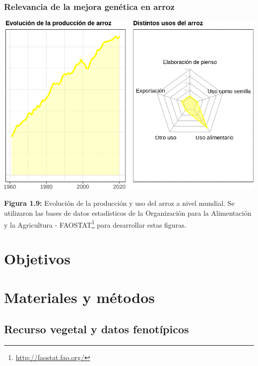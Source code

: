 \documentclass[11pt,spanish,a4paper,oneside,]{book} %
\renewcommand{\href}[2]{#2\footnote{\url{#1}}}
\let\rmarkdownfootnote\footnote%
\def\footnote{\protect\rmarkdownfootnote}
\renewcommand{\href}[2]{#2\footnote{\url{#1}}} %
\begin{document}
\hypertarget{relevancia-de-la-mejora-genuxe9tica-en-arroz}{%
\subsection{Relevancia de la mejora genética en arroz}\label{relevancia-de-la-mejora-genuxe9tica-en-arroz}}

\begin{center}\includegraphics[width=1\linewidth]{figures/Graf_arroz} \end{center}

\begin{center}
\textbf{Figura 1.9:} Evolución de la producción y uso del arroz a nivel mundial. Se utilizaron las bases de datos estadísticos de la Organización para la Alimentación y la Agricultura - \href{http://faostat.fao.org/}{FAOSTAT} para desarrollar estas figuras.

\end{center}

\hypertarget{objetivos}{%
\chapter{Objetivos}\label{objetivos}}

\hypertarget{materiales-y-muxe9todos}{%
\chapter{Materiales y métodos}\label{materiales-y-muxe9todos}}

\hypertarget{recurso-vegetal-y-datos-fenotuxedpicos}{%
\section{Recurso vegetal y datos fenotípicos}\label{recurso-vegetal-y-datos-fenotuxedpicos}}
\end{document}
